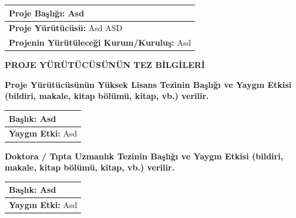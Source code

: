 \documentclass[a4paper]{article}
\begin{document}
\begin{center}
\end{center}
\vspace{0.3cm}

\begin{center}
\begin{tabular}{|m{}|}
\hline\vspace{1pt}
\textbf{Proje Başlığı:} Asd \\
\hline\vspace{1pt}
\textbf{Proje Yürütücüsü:} Asd ASD\\
\hline\vspace{1pt}
\textbf{Projenin Yürütüleceği Kurum/Kuruluş:} Asd \\
\hline
\end{tabular}
\end{center}

\vspace{0.3cm}
\noindent\textbf{PROJE YÜRÜTÜCÜSÜNÜN TEZ BİLGİLERİ}
\vspace{0.3cm}

\noindent\textbf{Proje Yürütücüsünün Yüksek Lisans Tezinin Başlığı ve Yaygın Etkisi {\small(bildiri, makale, kitap bölümü, kitap, vb.)} verilir.}
\vspace{-0.3cm}

\begin{center}
\begin{tabular}{|m{}|}
\hline\vspace{1pt}
\textbf{Başlık:} Asd \\
\hline\vspace{1pt}
\textbf{Yaygın Etki:} 
Asd \\
\hline
\end{tabular}
\end{center}

\vspace{0.3cm}
\noindent\textbf{Doktora / Tıpta Uzmanlık Tezinin Başlığı ve Yaygın Etkisi (bildiri, makale, kitap bölümü, kitap, vb.) verilir.}
\vspace{-0.3cm}

\begin{center}
\begin{tabular}{|m{}|}
\hline\vspace{1pt}
\textbf{Başlık:} Asd \\
\hline\vspace{1pt}
\textbf{Yaygın Etki:} 
Asd \\
\hline
\end{tabular}
\end{center}
\end{document}
